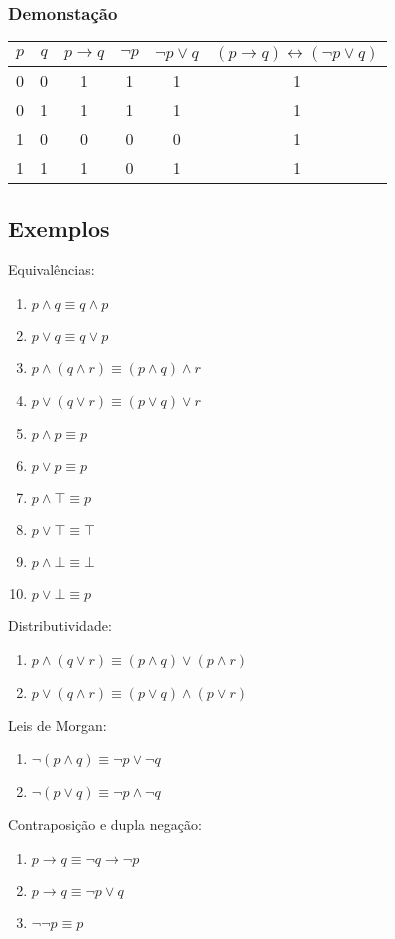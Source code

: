 \subsubsection{Demonstação}
\begin{table}[H]
    \begin{tabular}{|c|c|c||c|c|c|}
        \hline
        $p$ & $q$ & $p \rightarrow q$ & $\neg p$ & $\neg p \lor q$ & $(p \rightarrow q) \leftrightarrow (\neg p \lor q)$ \\
        \hline
        0 & 0 & 1 & 1 & 1 & 1 \\
        0 & 1 & 1 & 1 & 1 & 1 \\
        1 & 0 & 0 & 0 & 0 & 1 \\
        1 & 1 & 1 & 0 & 1 & 1 \\
        \hline
    \end{tabular}
\end{table}

\subsection{Exemplos}
\noindent Equivalências:
\begin{enumerate}
    \item $p \land q \equiv q \land p$
    \item $p \lor q \equiv q \lor p$
    \item $p \land (q \land r) \equiv (p \land q) \land r$
    \item $p \lor (q \lor r) \equiv (p \lor q) \lor r$
    \item $p \land p \equiv p$
    \item $p \lor p \equiv p$
    \item $p \land \top \equiv p$
    \item $p \lor \top \equiv \top$
    \item $p \land \bot \equiv \bot$
    \item $p \lor \bot \equiv p$
\end{enumerate}
Distributividade:
\begin{enumerate}
    \item $p \land (q \lor r) \equiv (p \land q) \lor (p \land r)$
    \item $p \lor (q \land r) \equiv (p \lor q) \land (p \lor r)$
\end{enumerate}
Leis de Morgan:
\begin{enumerate}
    \item $\neg (p \land q) \equiv \neg p \lor \neg q$
    \item $\neg (p \lor q) \equiv \neg p \land \neg q$
\end{enumerate}
Contraposição e dupla negação:
\begin{enumerate}
    \item $p \rightarrow q \equiv \neg q \rightarrow \neg p$
    \item $p \rightarrow q \equiv \neg p \lor q$
    \item $\neg \neg p \equiv p$
\end{enumerate}

